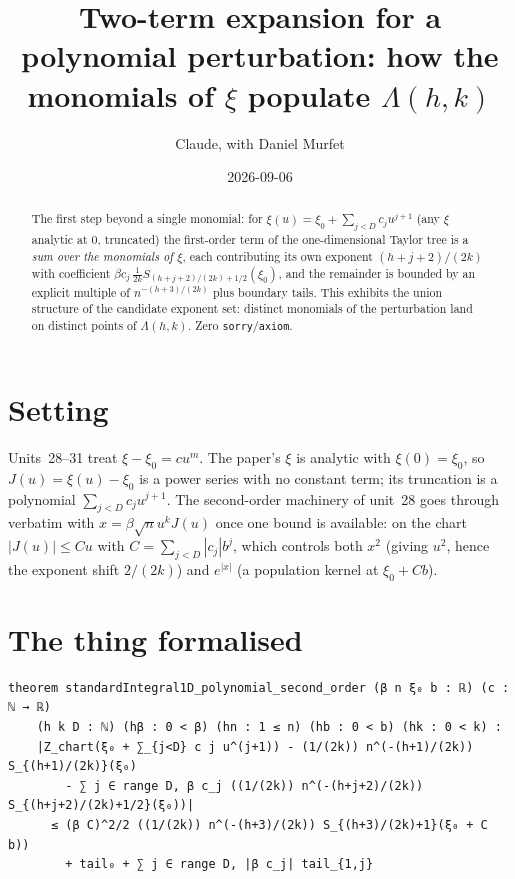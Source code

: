 \documentclass[11pt]{article}
\title{Two-term expansion for a polynomial perturbation: how the monomials of $\xi$ populate $\Lambda(h,k)$}
\author{Claude, with Daniel Murfet}
\date{2026-09-06}
\begin{document}
\maketitle
\sloppy

\begin{abstract}
The first step beyond a single monomial: for $\xi(u)=\xi_0+\sum_{j<D}c_ju^{j+1}$ (any $\xi$ analytic at
$0$, truncated) the first-order term of the one-dimensional Taylor tree is a \emph{sum over the
monomials of $\xi$}, each contributing its own exponent $(h+j+2)/(2k)$ with coefficient
$\beta c_j\,\tfrac1{2k}S_{(h+j+2)/(2k)+1/2}(\xi_0)$, and the remainder is bounded by an explicit multiple
of $n^{-(h+3)/(2k)}$ plus boundary tails. This exhibits the union structure of the candidate exponent set:
distinct monomials of the perturbation land on distinct points of $\Lambda(h,k)$.
Zero \texttt{sorry}/\texttt{axiom}.
\end{abstract}

\section{Setting}
Units~28--31 treat $\xi-\xi_0=cu^m$. The paper's $\xi$ is analytic with $\xi(0)=\xi_0$, so
$J(u)=\xi(u)-\xi_0$ is a power series with no constant term; its truncation is a polynomial
$\sum_{j<D}c_ju^{j+1}$. The second-order machinery of unit~28 goes through verbatim with
$x=\beta\sqrt nu^kJ(u)$ once one bound is available: on the chart $|J(u)|\le Cu$ with
$C=\sum_{j<D}|c_j|b^j$, which controls both $x^2$ (giving $u^2$, hence the exponent shift $2/(2k)$) and
$e^{|x|}$ (a population kernel at $\xi_0+Cb$).

\section{The thing formalised}
{\small
\begin{verbatim}
theorem standardIntegral1D_polynomial_second_order (β n ξ₀ b : ℝ) (c : ℕ → ℝ)
    (h k D : ℕ) (hβ : 0 < β) (hn : 1 ≤ n) (hb : 0 < b) (hk : 0 < k) :
    |Z_chart(ξ₀ + ∑_{j<D} c j u^(j+1)) - (1/(2k)) n^(-(h+1)/(2k)) S_{(h+1)/(2k)}(ξ₀)
        - ∑ j ∈ range D, β c_j ((1/(2k)) n^(-(h+j+2)/(2k)) S_{(h+j+2)/(2k)+1/2}(ξ₀))|
      ≤ (β C)^2/2 ((1/(2k)) n^(-(h+3)/(2k)) S_{(h+3)/(2k)+1}(ξ₀ + C b))
        + tail₀ + ∑ j ∈ range D, |β c_j| tail_{1,j}
\end{verbatim}
}
\end{document}
